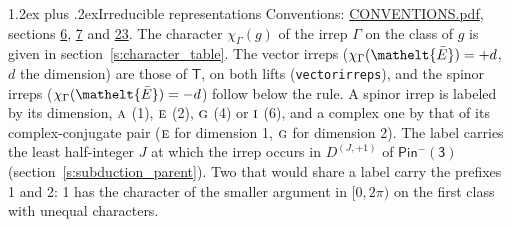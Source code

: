 \documentclass[10pt,a4paper]{article}
\makeatletter
\renewcommand\section{\@startsection{section}{1}{\z@}{-3ex plus -1ex minus -.2ex}%
  {1.2ex plus .2ex}{\normalfont\large\sffamily\bfseries\color{parttitle}}}
\numberwithin{equation}{section}
\newcommand{\eltfont}[1]{{\let\sigma\eltsigma\mathelt{#1}}}
\newcommand{\grp}[1]{\mathsf{#1}}
\newcommand{\irr}[1]{\text{\normalfont\scshape #1}}
\newcommand{\elt}[1]{\eltfont{#1}}
\newcommand{\irrJp}[2]{D^{(#1,#2)}}
\newcommand{\irchar}[1]{\chi_{#1}}
\newcommand{\barred}[1]{\bar{#1}}
\makeatother
\begin{document}
\section{Irreducible representations}\label{s:irreps}
Conventions: \href{../../CONVENTIONS.pdf}{CONVENTIONS.pdf}, sections \href{../../../rotation/CONVENTIONS.pdf\#conv.6}{6}, \href{../../../rotation/CONVENTIONS.pdf\#conv.7}{7} and \href{../../CONVENTIONS.pdf\#conv.23}{23}.
\leavevmode\label{n:function.character}\label{n:irrep.Gamma}The character $\irchar{\Gamma}(g)$ of the irrep $\Gamma$ on the class of $g$ is given in section~\ref{s:character_table}. \label{n:index.dimension}The vector irreps ($\irchar{\Gamma}(\elt{\barred{E}}) = +d$, $d$ the dimension) are those of \href{../../../rotation/data/pdf/T.pdf}{$\grp{T}$}, on both lifts (\texttt{vectorirreps}), and the spinor irreps ($\irchar{\Gamma}(\elt{\barred{E}}) = -d$) follow below the rule. A spinor irrep is labeled by its dimension, $\irr{a}$ (1), $\irr{e}$ (2), $\irr{g}$ (4) or $\irr{i}$ (6), and a complex one by that of its complex-conjugate pair ($\irr{e}$ for dimension 1, $\irr{g}$ for dimension 2). The label carries the least half-integer $J$ at which the irrep occurs in $\irrJp{J}{+1}$ of $\grp{Pin^{-}(3)}$ (section~\ref{s:subduction_parent}). Two that would share a label carry the prefixes 1 and 2: 1 has the character of the smaller argument in $[0, 2\pi)$ on the first class with unequal characters.
\end{document}
